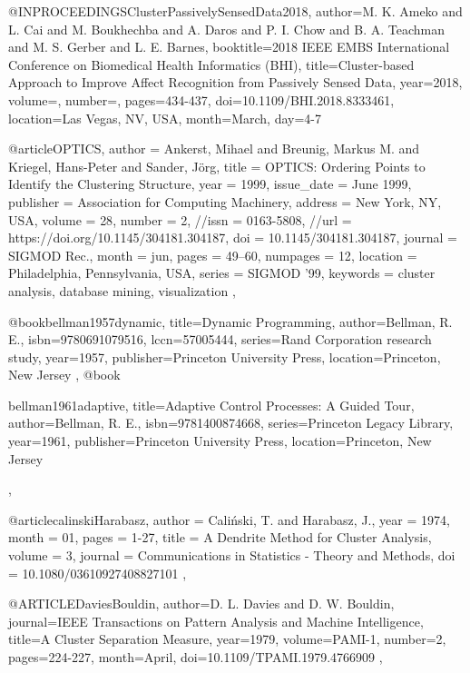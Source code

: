 @INPROCEEDINGS{ClusterPassivelySensedData2018,  
  author={M. K. {Ameko} and L. {Cai} and M. {Boukhechba} and A. {Daros} and P. I. {Chow} and B. A. {Teachman} and M. S. {Gerber} and L. E. {Barnes}},  
  booktitle={2018 IEEE EMBS International Conference on Biomedical Health Informatics (BHI)},  
  title={Cluster-based Approach to Improve Affect Recognition from Passively Sensed Data},   
  year={2018},  
  volume={},  
  number={},  
  pages={434-437},
  doi={10.1109/BHI.2018.8333461},
  location={Las Vegas, NV, USA},
  month={March},
  day={4-7}
}

@article{OPTICS,
  author = {Ankerst, Mihael and Breunig, Markus M. and Kriegel, Hans-Peter and Sander, J\"{o}rg},
  title = {OPTICS: Ordering Points to Identify the Clustering Structure},
  year = {1999},
  issue_date = {June 1999},
  publisher = {Association for Computing Machinery},
  address = {New York, NY, USA},
  volume = {28},
  number = {2},
  //issn = {0163-5808},
  //url = {https://doi.org/10.1145/304181.304187},
  doi = {10.1145/304181.304187},
  journal = {SIGMOD Rec.},
  month = jun,
  pages = {49–60},
  numpages = {12},
  location = {Philadelphia, Pennsylvania, USA},
  series = {SIGMOD ’99},
  keywords = {cluster analysis, database mining, visualization}
},

@book{bellman1957dynamic,
  title={Dynamic Programming},
  author={Bellman, R. E.},
  isbn={9780691079516},
  lccn={57005444},
  series={Rand Corporation research study},
  year={1957},
  publisher={Princeton University Press},
  location={Princeton, New Jersey}
},
@book{bellman1961adaptive,
  title={Adaptive Control Processes: A Guided Tour},
  author={Bellman, R. E.},
  isbn={9781400874668},
  series={Princeton Legacy Library},
  year={1961},
  publisher={Princeton University Press},
  location={Princeton, New Jersey}

},

@article{calinskiHarabasz,
  author = {Caliński, T. and Harabasz, J.},
  year = {1974},
  month = {01},
  pages = {1-27},
  title = {A Dendrite Method for Cluster Analysis},
  volume = {3},
  journal = {Communications in Statistics - Theory and Methods},
  doi = {10.1080/03610927408827101}
},

@ARTICLE{DaviesBouldin,
  author={D. L. {Davies} and D. W. {Bouldin}},
  journal={IEEE Transactions on Pattern Analysis and Machine Intelligence}, 
  title={A Cluster Separation Measure}, 
  year={1979},
  volume={PAMI-1},
  number={2},
  pages={224-227},
  month={April},
  doi={10.1109/TPAMI.1979.4766909}
},

